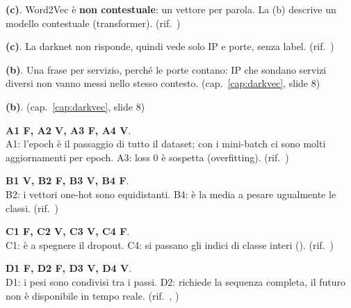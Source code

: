 \begin{soluzione}
\textbf{(c)}. Word2Vec è \textbf{non contestuale}: un vettore per parola. La (b) descrive un modello contestuale (transformer). (rif.\ )
\end{soluzione}

\begin{soluzione}
\textbf{(c)}. La darknet non risponde, quindi vede solo IP e porte, senza label. (rif.\ )
\end{soluzione}

\begin{soluzione}
\textbf{(b)}. Una frase per servizio, perché le porte contano: IP che sondano servizi diversi non vanno messi nello stesso contesto. (cap.~\ref{cap:darkvec}, slide 8)
\end{soluzione}

\begin{soluzione}
\textbf{(b)}. (cap.~\ref{cap:darkvec}, slide 8)
\end{soluzione}

\begin{soluzione}
\textbf{A1 F, A2 V, A3 F, A4 V}.\\
A1: l'epoch è il passaggio di tutto il dataset; con i mini-batch ci sono molti aggiornamenti per epoch. A3: loss 0 è sospetta (overfitting). (rif.\ )
\end{soluzione}

\begin{soluzione}
\textbf{B1 V, B2 F, B3 V, B4 F}.\\
B2: i vettori one-hot sono equidistanti. B4: è la media  a pesare ugualmente le classi. (rif.\ )
\end{soluzione}

\begin{soluzione}
\textbf{C1 F, C2 V, C3 V, C4 F}.\\
C1: è  a spegnere il dropout. C4: si passano gli indici di classe interi (). (rif.\ )
\end{soluzione}

\begin{soluzione}
\textbf{D1 F, D2 F, D3 V, D4 V}.\\
D1: i pesi sono condivisi tra i passi. D2: richiede la sequenza completa, il futuro non è disponibile in tempo reale. (rif.\ , )
\end{soluzione}

